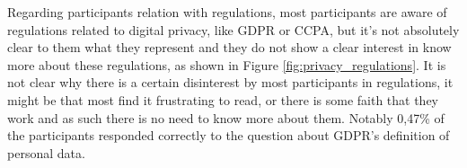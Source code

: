 

Regarding participants relation with regulations, most participants are
aware of regulations related to digital privacy, like GDPR or CCPA, but
it's not absolutely clear to them what they represent and they do not
show a clear interest in know more about these regulations, as shown in Figure \ref{fig:privacy_regulations}. It is not
clear why there is a certain disinterest by most participants in regulations,
it might be that most find it frustrating to read, or there is some
faith that they work and as such there is no need to know more about them.
Notably 0,47\% of the participants responded correctly to the question
about GDPR's definition of personal data.

